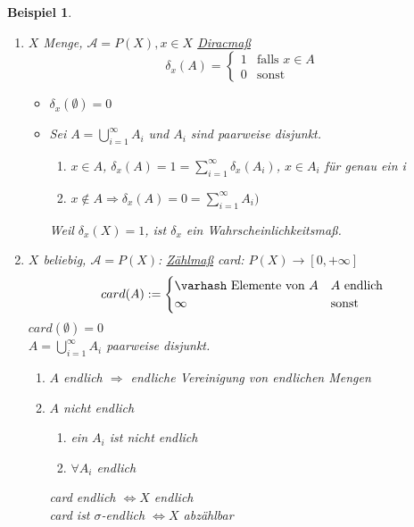 \documentclass[11pt]{memoir}
\theoremstyle{break}
\newtheorem{Beispiel}{Beispiel}[chapter]
\begin{document}
\begin{Beispiel}
\begin{enumerate}
	\item $X$ Menge, $\mathscr{A} = P(X), x \in X$ \underline{Diracmaß}
	\begin{equation}
		\delta_{x} (A) =
		\begin{cases}
			1 & \text{falls } x \in A\\
			0 & \text{sonst}
		\end{cases}
	\end{equation}
	\begin{itemize}
		\item $\delta_x ( \emptyset) = 0$
		\item Sei $A = \bigcup\limits_{i=1}^{\infty} A_i$ und $A_i$ sind paarweise disjunkt.
		\begin{enumerate}
			\item $x \in A$, $\delta_x(A) = 1 = \sum\limits_{i=1}^{\infty} \delta_x(A_i)$, $x \in A_i$ für genau ein i
			\item $x \notin A \Rightarrow \delta_x(A) = 0 = \sum\limits_{i=1}^{\infty}A_i)$
					\end{enumerate}
		Weil $\delta_x(X) = 1$, ist $\delta_x$ ein Wahrscheinlichkeitsmaß.
	\end{itemize}
	\item $X$ beliebig, $\mathscr{A} = P(X)$: \underline{Zählmaß} card: $P(X) \rightarrow [0, +\infty]$
	\begin{equation}
		card(A) :=
		\begin{cases}
			\varhash \text{ Elemente von } A & A \text{ endlich} \\
			\infty & \text{sonst}
		\end{cases}
	\end{equation}
	$card(\emptyset) = 0$ \\
	$A = \bigcup\limits_{i=1}^{\infty} A_i$ paarweise disjunkt.
	\begin{enumerate}
		\item $A$ endlich $\Rightarrow$ endliche Vereinigung von endlichen Mengen
		\item $A$ nicht endlich
		\begin{enumerate}
			\item ein $A_i$ ist nicht endlich
			\item $\forall A_i$ endlich
		\end{enumerate}
		card endlich $\Leftrightarrow X$ endlich \\
		card ist $\sigma$-endlich $\Leftrightarrow X$ abzählbar
	\end{enumerate}
\end{enumerate}
\end{Beispiel}
\end{document}
